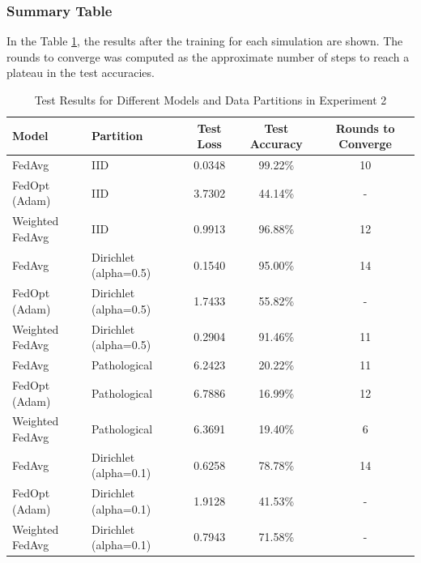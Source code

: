\documentclass[11pt]{article}
\begin{document}
    \subsubsection{Summary Table}

    In the Table \ref{tab:experiment_2_results}, the results after the training for each simulation are shown. The rounds to converge was computed as the approximate number of steps to reach a plateau in the test accuracies.

    \begin{table}[h!]
        \centering
        \caption{Test Results for Different Models and Data Partitions in Experiment 2}
        \label{tab:experiment_2_results}
        \begin{tabular}{|l|l|c|c|c|}
            \hline
            \textbf{Model}  & \textbf{Partition}    & \textbf{Test Loss} & \textbf{Test Accuracy} & \textbf{Rounds to Converge} \\
            \hline
            FedAvg          & IID                   & 0.0348             & 99.22\%                & 10                          \\
            FedOpt (Adam)   & IID                   & 3.7302             & 44.14\%                & -                           \\
            Weighted FedAvg & IID                   & 0.9913             & 96.88\%                & 12                          \\
            \hline
            FedAvg          & Dirichlet (alpha=0.5) & 0.1540             & 95.00\%                & 14                          \\
            FedOpt (Adam)   & Dirichlet (alpha=0.5) & 1.7433             & 55.82\%                & -                           \\
            Weighted FedAvg & Dirichlet (alpha=0.5) & 0.2904             & 91.46\%                & 11                          \\
            \hline
            FedAvg          & Pathological          & 6.2423             & 20.22\%                & 11                          \\
            FedOpt (Adam)   & Pathological          & 6.7886             & 16.99\%                & 12                          \\
            Weighted FedAvg & Pathological          & 6.3691             & 19.40\%                & 6                           \\
            \hline
            FedAvg          & Dirichlet (alpha=0.1) & 0.6258             & 78.78\%                & 14                          \\
            FedOpt (Adam)   & Dirichlet (alpha=0.1) & 1.9128             & 41.53\%                & -                           \\
            Weighted FedAvg & Dirichlet (alpha=0.1) & 0.7943             & 71.58\%                & -                           \\
            \hline
        \end{tabular}
    \end{table}
\end{document}
